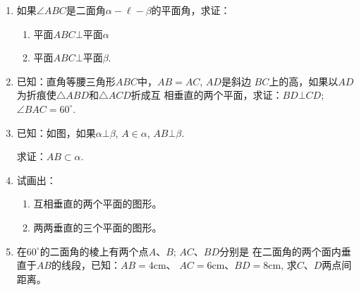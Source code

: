 \begin{ex}
\begin{enumerate}
  \item  如果$\angle ABC$是二面角$\alpha-\ell-\beta$的平面角，求证：
\begin{enumerate}
  \item 平面$ABC\bot $平面$\alpha$
  \item 平面$ABC\bot$平面$\beta$.
\end{enumerate}

  \item   已知：直角等腰三角形$ABC$中，$AB=AC$, $AD$是斜边
  $BC$上的高，如果以$AD$为折痕使$\triangle ABD$和$\triangle ACD$折成互
  相垂直的两个平面，求证：$BD\bot CD$; $\angle BAC=
  60^{\circ}$.
  \item  已知：如图，如果$\alpha\bot\beta$, $A\in\alpha$, $AB\bot\beta$.
  
  求证：$AB\subset \alpha$.

  \item  试画出：
\begin{enumerate}
  \item 互相垂直的两个平面的图形。
  \item 两两垂直的三个平面的图形。
\end{enumerate}

  \item  在$ 60^{\circ}$的二面角的棱上有两个点$A$、$B$; $AC$、$BD$分别是
  在二面角的两个面内垂直于$AB$的线段，已知：$AB=4$cm、
  $AC=6$cm、$BD=8$cm, 求$C$、$D$两点间距离。
\end{enumerate}
\end{ex}

